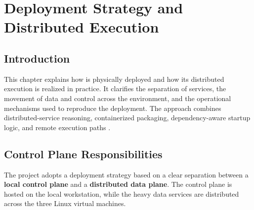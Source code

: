 \chapter{Deployment Strategy and Distributed Execution}

\section{Introduction}
This chapter explains how \projectname{} is physically deployed and how its distributed execution is realized in practice. It clarifies the separation of services, the movement of data and control across the environment, and the operational mechanisms used to reproduce the deployment. The approach combines distributed-service reasoning, containerized packaging, dependency-aware startup logic, and remote execution paths \cite{docker_docs,apache_spark_docs,apache_hadoop_docs}.

\section{Control Plane Responsibilities}
The project adopts a deployment strategy based on a clear separation between a \textbf{local control plane} and a \textbf{distributed data plane}. The control plane is hosted on the local workstation, while the heavy data services are distributed across the three Linux virtual machines.


